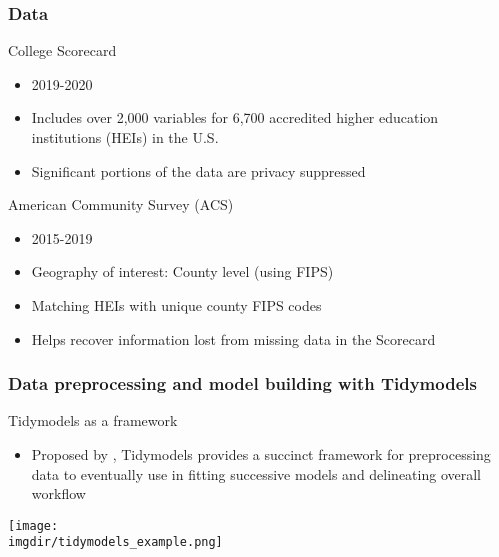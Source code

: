 \documentclass[aspectratio=169, t, 10pt]{beamer}
\begin{document}
\begin{frame}
  \frametitle{Data}
    \begin{block}{College Scorecard}
      \begin{itemize}
      \item 2019-2020 
      \item Includes over 2,000 variables for 6,700 accredited higher
        education institutions (HEIs) in the U.S.
      \item Significant portions of the data are privacy suppressed
      \end{itemize}
    \end{block}
  \begin{block}{American Community Survey (ACS)}
    \begin{itemize}
    \item 2015-2019
    \item Geography of interest: County level (using FIPS)
    \item Matching HEIs with unique county FIPS codes
    \item Helps recover information lost from missing data in the Scorecard
    \end{itemize}
  \end{block}
\end{frame}

\begin{frame}
  \frametitle{Data preprocessing and model building with Tidymodels}
  \begin{block}{Tidymodels as a framework}
    \begin{itemize}
    \item Proposed by \citet{Kuhn_Silge_2022}, Tidymodels provides a
      succinct framework for preprocessing data to eventually use in
      fitting successive models and delineating overall workflow
     \end{itemize}
   \end{block}
   \begin{block}{}
     \vspace{-.75cm}%
     \centering
        \texttt{[image: \\imgdir/tidymodels\_example.png]}
   \end{block}   
\end{frame}
\end{document}
